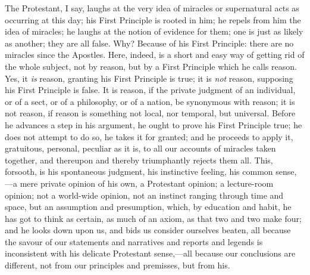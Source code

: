 The Protestant, I say, laughs at the very idea of
miracles or supernatural acts as occurring at this day;
his First Principle is rooted in him; he repels from him
the idea of miracles; he laughs at the notion of evidence
for them; one is just as likely as another; they are all
false. Why? Because of his First Principle: there are no
miracles since the Apostles. Here, indeed, is a short and
easy way of getting rid of the whole subject, not by
reason, but by a First Principle which he calls reason.
Yes, it \emph{is} reason, granting his First Principle
is true; it is \emph{not} reason, supposing his First
Principle is false. It is reason, if the private judgment
of an individual, or of a sect, or of a philosophy, or of
a nation, be synonymous with reason; it is not reason, if
reason is something not local, nor temporal, but
universal. Before he advances a step in his argument, he
ought to prove his First Principle true; he does not
attempt to do so, he takes it for granted; and he
proceeds to apply it, gratuitous, personal, peculiar as
it is, to all our accounts of miracles taken together,
and thereupon and thereby triumphantly rejects them all.
This, forsooth, is his spontaneous judgment, his
instinctive feeling, his common sense,—a mere
private opinion of his own, a Protestant opinion; a
lecture-room opinion; not a world-wide opinion, not an
instinct ranging through time and space, but an
assumption and presumption, which, by education and
habit, he has got to think as certain, as much of an
axiom, as that two and two make four; and he looks down
upon us, and bids us consider ourselves beaten, all
because the savour of our statements and narratives and
reports and legends is inconsistent with his delicate
Protestant sense,—all because our conclusions are
different, not from our principles and premisses, but
from his.


